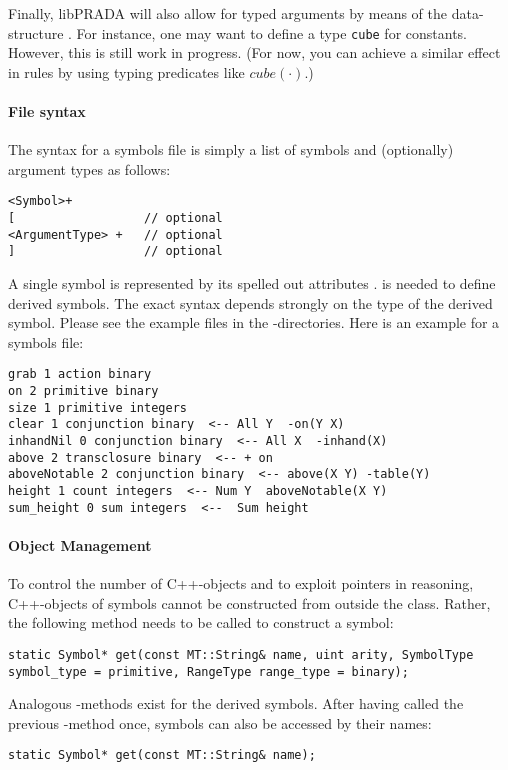 \documentclass[10pt,twoside,twocolumn,fleqn]{article}
\begin{document}
Finally, libPRADA will also allow for typed arguments by means of the
data-structure . For instance, one may want to define a
type \texttt{cube} for constants. However, this is still work in progress.
(For now, you can achieve a similar effect in rules by using typing
predicates like $cube(\cdot)$.)



\paragraph{File syntax}

The syntax for a symbols file is simply a list of symbols and
(optionally) argument types as follows:
\begin{lstlisting}
<Symbol>+
[                  // optional
<ArgumentType> +   // optional
]                  // optional
\end{lstlisting}
A single symbol is represented by its spelled out attributes . \code{[otherstuff]} is needed to
define derived symbols. The exact syntax depends strongly on the type of
the derived symbol. Please see the example files in the
-directories. Here is an example for a symbols file:
\begin{lstlisting}
grab 1 action binary
on 2 primitive binary
size 1 primitive integers
clear 1 conjunction binary  <-- All Y  -on(Y X)
inhandNil 0 conjunction binary  <-- All X  -inhand(X)
above 2 transclosure binary  <-- + on
aboveNotable 2 conjunction binary  <-- above(X Y) -table(Y)
height 1 count integers  <-- Num Y  aboveNotable(X Y)
sum_height 0 sum integers  <--  Sum height
\end{lstlisting}




\paragraph{Object Management}

To control the number of C++-objects and to exploit pointers in reasoning,
C++-objects of symbols cannot be constructed from outside the class.
Rather, the following method needs to be called to construct a symbol:    
\begin{lstlisting}
static Symbol* get(const MT::String& name, uint arity, SymbolType
symbol_type = primitive, RangeType range_type = binary);
\end{lstlisting}
Analogous -methods exist for the derived symbols. After having
called the previous -method once, symbols can also be accessed by
their names:
\begin{lstlisting}
static Symbol* get(const MT::String& name);
\end{lstlisting}
\end{document}
